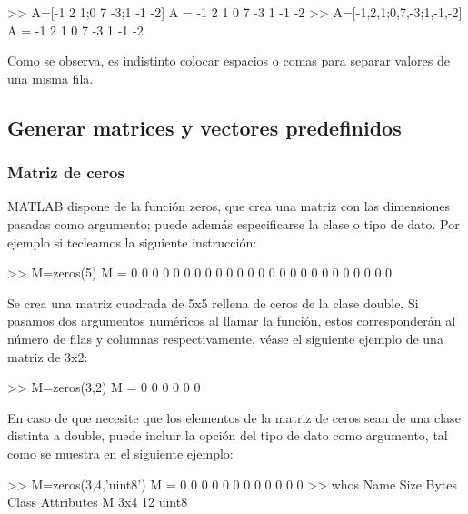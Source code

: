 \begin{matlab}
>> A=[-1 2 1;0 7 -3;1 -1 -2]
A =
    -1     2     1
     0     7    -3
     1    -1    -2
>> A=[-1,2,1;0,7,-3;1,-1,-2]
A =
    -1     2     1
     0     7    -3
     1    -1    -2
\end{matlab}

Como se observa, es indistinto colocar espacios o comas para separar
valores de una misma fila.

\subsection{Generar matrices y vectores predefinidos}\label{generar-matrices-y-vectores-predefinidos}

\subsubsection{Matriz de ceros}\label{matriz-de-ceros}

MATLAB dispone de la función zeros, que crea una matriz con las
dimensiones pasadas como argumento; puede además especificarse la clase
o tipo de dato. Por ejemplo si tecleamos la siguiente instrucción:

\begin{matlab}
>> M=zeros(5)
M =
     0     0     0     0     0
     0     0     0     0     0
     0     0     0     0     0
     0     0     0     0     0
     0     0     0     0     0
\end{matlab}

Se crea una matriz cuadrada de 5x5 rellena de ceros de la clase double.
Si pasamos dos argumentos numéricos al llamar la función, estos
corresponderán al número de filas y columnas respectivamente, véase el
siguiente ejemplo de una matriz de 3x2:

\begin{matlab}
>> M=zeros(3,2)
M =
     0     0
     0     0
     0     0
\end{matlab}

En caso de que necesite que los elementos de la matriz de ceros sean de
una clase distinta a double, puede incluir la opción del tipo de dato
como argumento, tal como se muestra en el siguiente ejemplo:

\begin{matlab}
>> M=zeros(3,4,'uint8')
M =
    0    0    0    0
    0    0    0    0
    0    0    0    0
>> whos
  Name      Size            Bytes  Class    Attributes
  M         3x4                12  uint8              
\end{matlab}

